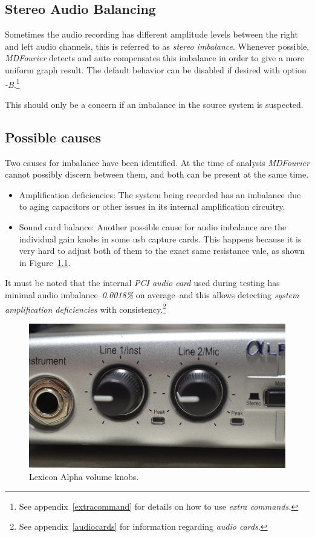 \documentclass[10pt,a4paper]{report}
\begin{document}
\begin{appendices}
\chapter{Stereo Audio Balancing}
\label{stereobalancing}

Sometimes the audio recording has different amplitude levels between the right and left audio channels, this is referred to as \textit{stereo imbalance}. Whenever possible, \textit{MDFourier} detects and auto compensates this imbalance in order to give a more uniform graph result. The default behavior can be disabled if desired with option \textit{-B}.\footnote{See appendix~\ref{extracommand} for details on how to use \textit{extra commands.}}

This should only be a concern if an imbalance in the source system is suspected. 

\section{Possible causes}

Two causes for imbalance have been identified. At the time of analysis \textit{MDFourier} cannot possibly discern between them, and both can be present at the same time. 

\begin{itemize}
	\item Amplification deficiencies: The system being recorded has an imbalance due to aging capacitors or other issues in its internal amplification circuitry.
	\item Sound card balance: Another possible cause for audio imbalance are the individual gain knobs in some usb capture cards. This happens because it is very hard to adjust both of them to the exact same resistance vale, as shown in   Figure~\ref{fig:lexiconknobs}.
\end{itemize}

It must be noted that the internal \textit{PCI audio card} used during testing has minimal audio imbalance--\textit{0.0018\%} on average--and this allows detecting \textit{system amplification deficiencies} with consistency.\footnote{See appendix~\ref{audiocards} for information regarding \textit{audio cards}.}

\begin{figure}[H]
	\centering
	\includegraphics[width=0.8\linewidth]{images/imbalance/lexicon.png}
	\caption[Lexicon knobs]{Lexicon Alpha volume knobs.}
	\label{fig:lexiconknobs}
\end{figure}


\end{appendices}
\end{document}
